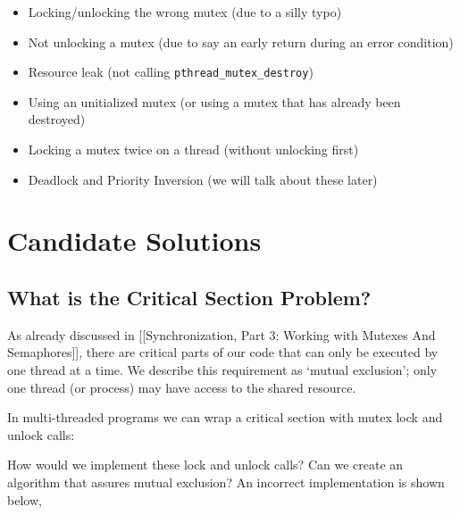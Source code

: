 \begin{itemize}
\tightlist
\item
  Locking/unlocking the wrong mutex (due to a silly typo)
\item
  Not unlocking a mutex (due to say an early return during an error
  condition)
\item
  Resource leak (not calling \texttt{pthread\_mutex\_destroy})
\item
  Using an unitialized mutex (or using a mutex that has already been
  destroyed)
\item
  Locking a mutex twice on a thread (without unlocking first)
\item
  Deadlock and Priority Inversion (we will talk about these later)
\end{itemize}

\section{Candidate Solutions}\label{candidate-solutions}

\subsection{What is the Critical Section
Problem?}\label{what-is-the-critical-section-problem}

As already discussed in {[}{[}Synchronization, Part 3: Working with
Mutexes And Semaphores{]}{]}, there are critical parts of our code that
can only be executed by one thread at a time. We describe this
requirement as `mutual exclusion'; only one thread (or process) may have
access to the shared resource.

In multi-threaded programs we can wrap a critical section with mutex
lock and unlock calls:

\begin{Shaded}
\begin{Highlighting}[]
\end{Highlighting}
\end{Shaded}

How would we implement these lock and unlock calls? Can we create an
algorithm that assures mutual exclusion? An incorrect implementation is
shown below,

\begin{Shaded}
\begin{Highlighting}[]
\NormalTok{;\}}
\NormalTok{; \}}
\end{Highlighting}
\end{Shaded}

